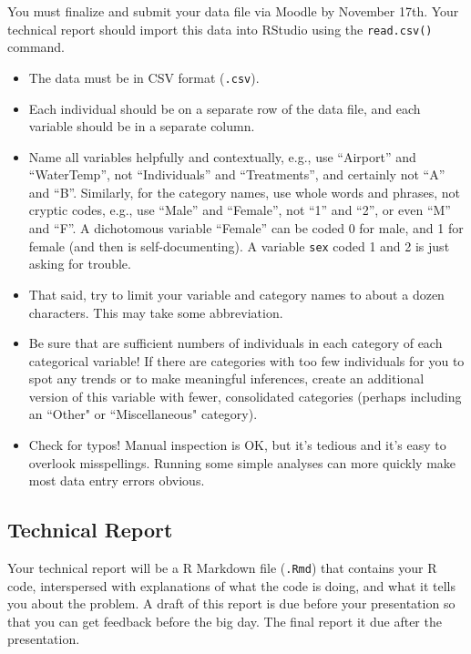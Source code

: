 \documentclass[10pt]{article}
\begin{document}
You must finalize and submit your data file via Moodle by November 17th. Your technical report should import this data into RStudio using the \texttt{read.csv()} command. 

\begin{itemize}
	\item The data must be in CSV format (\texttt{.csv}).
	\item Each individual should be on a separate row of the data file, and each variable should be in a separate column.
	\item Name all variables helpfully and contextually, e.g., use “Airport” and “WaterTemp”, not “Individuals” and “Treatments”, and certainly not “A” and “B”.
Similarly, for the category names, use whole words and phrases, not cryptic codes, e.g., use “Male” and “Female”, not “1” and “2”, or even “M” and “F”.  A dichotomous variable “Female” can be coded 0 for male, and 1 for female (and then is self-documenting). A variable {\tt sex} coded 1 and 2 is just asking for trouble.
	\item That said, try to limit your variable and category names to about a dozen characters.  This may take some abbreviation.
	\item Be sure that are sufficient numbers of individuals in each category of each categorical variable!  If there are categories with too few individuals for you to spot any trends or to make meaningful inferences, create an additional version of this variable with fewer, consolidated categories (perhaps including an ``Other" or ``Miscellaneous" category).
	\item Check for typos!  Manual inspection is OK, but it’s tedious and it’s easy to overlook misspellings.  Running some simple analyses can more quickly make most data entry errors obvious.
\end{itemize}

\subsection{Technical Report}

Your technical report will be a R Markdown file (\texttt{.Rmd}) that contains your R code, interspersed with explanations of what the code is doing, and what it tells you about the problem. A draft of this report is due before your presentation so that you can get feedback before the big day. The final report it due after the presentation.
	
\end{document}
